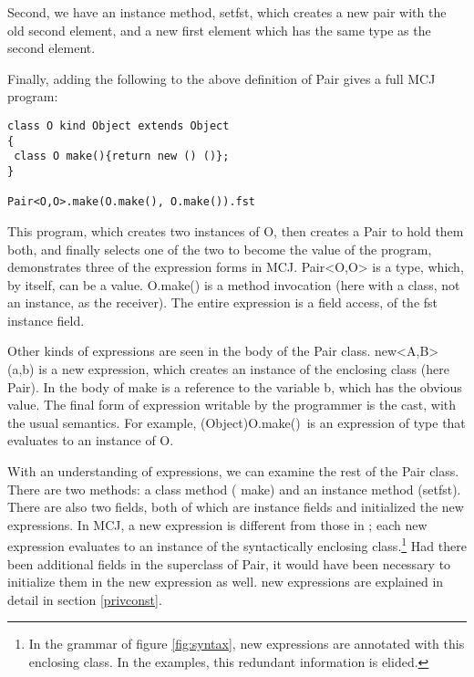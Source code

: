 \documentclass{acm-sigplan}
\begin{document}
Second, we have an instance method, {\txt setfst}, which creates a new
pair with the old second element, and a new first element which has
the same type as the second element.

Finally, adding the following to the above definition of {\txt Pair}
gives a full MCJ program:

\begin{verbatim}
class O kind Object extends Object
{
 class O make(){return new () ()};
}

Pair<O,O>.make(O.make(), O.make()).fst
\end{verbatim}

This program, which creates two instances of {\txt O}, then creates
a {\txt Pair} to hold them both, and finally selects one of the two to
become the value of the program, demonstrates three of the expression
forms in MCJ.  {\txt Pair<O,O>} is a type, which, by itself, can
be a value.  {\txt O.make()} is a method invocation (here with a
class, not an instance, as the receiver).  The entire expression is a
field access, of the {\txt fst} instance field.

Other kinds of expressions are seen in the body of the {\txt Pair}
class.  {\txt new<A,B> (a,b)} is a new expression, which creates an
instance of the enclosing class (here {\txt Pair}).  In the body of
{\txt make} is a reference to the variable {\txt b}, which has the
obvious value.  The final form of expression writable by the
programmer is the cast, with the usual semantics. For example, {\txt
(Object)O.make()}\ is an expression of type \Object that evaluates to
an instance of {\txt O}.

With an understanding of expressions, we can examine the rest of the
{\txt Pair} class.  There are two methods: a class method ({\txt
make}) and an instance method ({\txt setfst}).  There are also two
fields, both of which are instance fields and initialized the {\txt
new} expressions. In MCJ, a {\txt new} expression is different from
those in \FGJ; each {\txt new} expression evaluates to an instance of
the syntactically enclosing class.\footnote{In the grammar of figure
\ref{fig:syntax}, {\txt new} expressions are annotated with this
enclosing class.  In the examples, this redundant information is
elided.}  Had there been additional fields in the superclass of {\txt
Pair}, it would have been necessary to initialize them in the {\txt
new} expression as well. {\txt new} expressions are explained in
detail in section \ref{privconst}.

\end{document}
